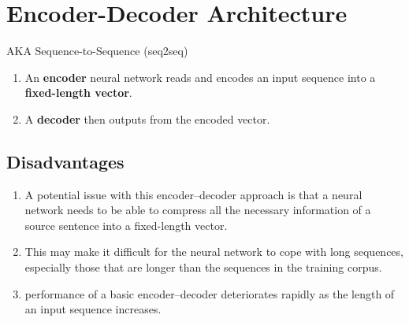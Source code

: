 \chapter{Encoder-Decoder Architecture}

AKA Sequence-to-Sequence (seq2seq)

\begin{enumerate}
    \item An \textbf{encoder} neural network reads and encodes an input sequence into a \textbf{fixed-length vector}.
    \hfill \cite{adv-ml-tech/paper/arxiv.org/1409.0473}

    \item A \textbf{decoder} then outputs from the encoded vector.
    \hfill \cite{adv-ml-tech/paper/arxiv.org/1409.0473}
\end{enumerate}


\section{Disadvantages}
\begin{enumerate}
    \item A potential issue with this encoder–decoder approach is that a neural network needs to be able to compress all the necessary information of a source sentence into a fixed-length vector.
    \hfill \cite{adv-ml-tech/paper/arxiv.org/1409.0473}

    \item This may make it difficult for the neural network to cope with long sequences, especially those that are longer than the sequences in the training corpus.
    \hfill \cite{adv-ml-tech/paper/arxiv.org/1409.0473}

    \item  performance of a basic encoder–decoder deteriorates rapidly as the length of an input sequence increases.
    \hfill \cite{adv-ml-tech/paper/arxiv.org/1409.0473}
\end{enumerate}












